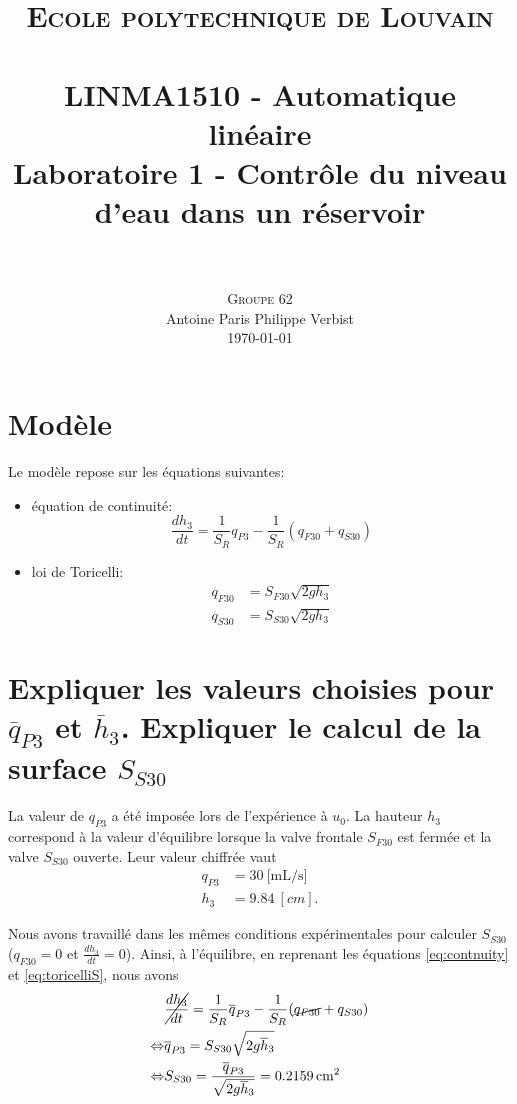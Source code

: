 \documentclass[frenchb, paper=a4, fontsize=11pt]{scrartcl}
\title{
		\usefont{OT1}{bch}{b}{n}
		\normalfont \normalsize \textsc{Ecole polytechnique de Louvain} \\ [25pt]
		\horrule{0.5pt} \\[0.4cm]
		\large LINMA1510 - Automatique linéaire\\
		\huge Laboratoire 1 - Contrôle du niveau d'eau dans un réservoir \\
		\horrule{1.5pt} \\[0.5cm]
}
\author{
		\normalfont
		\textsc{Groupe 62}\\
      	Antoine Paris\hspace{0.6cm} Philippe Verbist \\	
       	\normalsize
        \today
}
\date{}
\newcommand*\eq[1]{\overline{#1}} 				%
\numberwithin{equation}{section}					%
\numberwithin{figure}{section}					%
\numberwithin{table}{section}						%
\begin{document}
\maketitle


\section{Modèle}

Le modèle repose sur les équations suivantes:
\begin{itemize}
\item équation de continuité:
\begin{equation}
\frac{dh_3}{dt} = \frac{1}{S_R}q_{P3} - \frac{1}{S_R}(q_{F30}+q_{S30})
\label{eq:contnuity}
\end{equation}
\item loi de Toricelli:
\begin{align}
q_{F30}& = S_{F30} \sqrt{2gh_3} \label{eq:toricelliF}\\
q_{S30} &= S_{S30} \sqrt{2gh_3} \label{eq:toricelliS}
\end{align}
\end{itemize}

\section{Expliquer les valeurs choisies pour $\eq{q}_{P3}$ et $\eq{h}_3$. Expliquer le calcul de la surface $S_{S30}$}

La valeur de $q_{P3}$ a été imposée lors de l'expérience à $u_0$. La hauteur $h_3$ correspond à la valeur d'équilibre lorsque la valve frontale $S_{F30}$ est fermée et la valve $S_{S30}$ ouverte. Leur valeur chiffrée vaut
\begin{align}
q_{P3} & = \SI{30}{[\milli\liter\per\second]}\\
h_3 & = \SI{9.84}{[cm]}.
\end{align}

Nous avons travaillé dans les mêmes conditions expérimentales pour calculer $S_{S30}$ ($q_{F30} = 0$ et $\frac{dh_3}{dt} = 0$). Ainsi, à l'équilibre, en reprenant les équations \ref{eq:contnuity} et \ref{eq:toricelliS}, nous avons
\begin{align}
&\cancel{\frac{dh_3}{dt}} = \frac{1}{S_R}\eq{q}_{P3} - \frac{1}{S_R}(\cancel{q_{F30}}+q_{S30})\\
\Leftrightarrow & \eq{q}_{P3} = S_{S30} \sqrt{2g\eq{h}_3} \\
\Leftrightarrow & S_{S30} = \frac{\eq{q}_{P3}}{ \sqrt{2g\eq{h}_3}} = \SI{0.2159}{cm^2}
\end{align}
\end{document}
